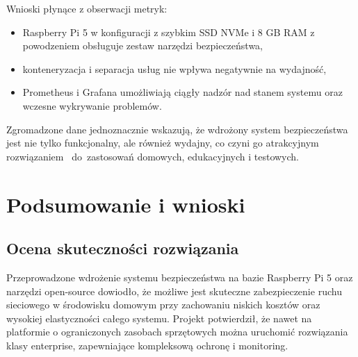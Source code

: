 \documentclass[
    left=2.5cm,         %
    right=2.5cm,        %
    top=2.5cm,          %
    bottom=3cm,         %
    bindingoffset=6mm,  %
    nohyphenation=true %
]{eiti/eiti-thesis} %
\begin{document}
Wnioski płynące z obserwacji metryk:
\begin{itemize}
    \item Raspberry Pi 5 w konfiguracji z szybkim SSD NVMe i 8 GB RAM z powodzeniem obsługuje zestaw narzędzi bezpieczeństwa,
    \item konteneryzacja i separacja usług nie wpływa negatywnie na wydajność,
    \item Prometheus i Grafana umożliwiają ciągły nadzór nad stanem systemu oraz wczesne wykrywanie problemów.
\end{itemize}

Zgromadzone dane jednoznacznie wskazują, że wdrożony system bezpieczeństwa jest nie tylko funkcjonalny, ale również wydajny, co czyni go atrakcyjnym rozwiązaniem 
~do~zastosowań domowych, edukacyjnych i testowych.

\newpage 
\section{Podsumowanie i wnioski}

\subsection{Ocena skuteczności rozwiązania}

Przeprowadzone wdrożenie systemu bezpieczeństwa na bazie Raspberry Pi 5 oraz narzędzi open-source dowiodło, że możliwe jest skuteczne zabezpieczenie ruchu sieciowego w środowisku domowym przy zachowaniu niskich kosztów oraz wysokiej elastyczności całego systemu. Projekt potwierdził, że nawet na platformie o ograniczonych zasobach sprzętowych można uruchomić rozwiązania klasy enterprise, zapewniające kompleksową ochronę i monitoring.
\end{document}
